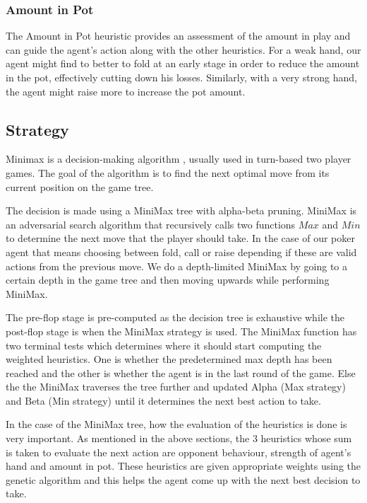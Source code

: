\documentclass{article}
\begin{document}
\subsubsection{Amount in Pot}

The Amount in Pot heuristic provides an assessment of the amount in play and can guide the agent's action along with the other heuristics. For a weak hand, our agent might find to better to fold at an early stage in order to reduce the amount in the pot, effectively cutting down his losses. Similarly, with a very strong hand, the agent might raise more to increase the pot amount. 

\subsection{Strategy}
Minimax is a decision-making algorithm , usually used in turn-based two player games. The goal of the algorithm is to find the next optimal move from its current position on the game tree.

The decision is made using a MiniMax tree with alpha-beta pruning. MiniMax is an adversarial search algorithm that recursively calls two functions $Max$ and $Min$ to determine the next move that the player should take. In the case of our poker agent that means choosing between fold, call or raise depending if these are valid actions from the previous move. We do a depth-limited MiniMax by going to a certain depth in the game tree and then moving upwards while performing MiniMax.  

The pre-flop stage is pre-computed as the decision tree is exhaustive while the post-flop stage is when the MiniMax strategy is used. The MiniMax function has two terminal tests which determines where it should start computing the weighted heuristics. One is whether the predetermined max depth has been reached and the other is whether the agent is in the last round of the game. Else the the MiniMax traverses the tree further and updated Alpha (Max strategy) and Beta (Min strategy) until it determines the next best action to take. 

In the case of the MiniMax tree, how the evaluation of the heuristics is done is very important. As mentioned in the above sections, the 3 heuristics whose sum is taken to evaluate the next action are opponent behaviour, strength of agent’s hand and amount in pot. These heuristics are given appropriate weights using the genetic algorithm and this helps the agent come up with the next best decision to take.
\end{document}

